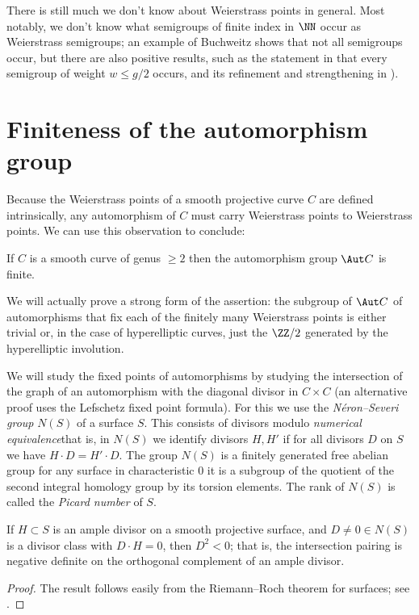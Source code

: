 There is still much we don't know about Weierstrass points in
general. Most notably, we don't know what semigroups of finite index in
$\NN$ occur as Weierstrass semigroups; an example of Buchweitz shows
%
that not all semigroups occur, but there are also positive results,
such as the statement in
\cite{EHWeierstrass}
that every semigroup of weight $w \leq g/2$
%
occurs, and its refinement and strengthening in \cite{MR3892968}).


\section{Finiteness of the automorphism group}\label{finiteness section}

Because the Weierstrass points of a smooth projective curve $C$ are
%
defined intrinsically, any automorphism of $C$ must carry Weierstrass
points to Weierstrass points. We can use this observation to
conclude:

\begin{theorem}\label{finite autos}
If $C$ is a smooth curve of genus $\geq 2$ then the automorphism group
$\Aut C$ is finite.
\end{theorem}

We will actually prove a strong form of the assertion: the subgroup of
$\Aut C$ of automorphisms that fix each  of the finitely many Weierstrass
points is either
 trivial or, in the case of hyperelliptic curves, just the $\ZZ/2$
 generated by the hyperelliptic involution.

We will study the fixed points of automorphisms by studying the
intersection of the graph of
an automorphism with the diagonal divisor in $C\times C$ (an alternative
proof uses the Lefschetz fixed point formula). For this we use the
%
%
\emph{N\'eron--Severi group} $N(S)$ of a surface $S$. This consists of
divisors modulo \emph{numerical equivalence}\emdash that is, in $N(S)$ we
%
identify divisors $H, H'$ if for all divisors $D$ on $S$ we have $H\cdot
D = H'\cdot D$. The group
$N(S)$ is a  finitely generated free abelian group for any surface\emdash
in characteristic 0 it is a subgroup of the quotient of the second
integral homology group by its torsion elements. The rank of $N(S)$
is called the \emph{Picard number} of $S$.

\begin{theorem}\label{hodge index}
If $H\subset S$ is an ample divisor on a smooth projective surface,
%
and $D \neq 0 \in N(S)$ is a divisor class with $D\cdot H = 0$, then
$D^2<0$; that is, the intersection pairing is negative definite on the
orthogonal complement of an
ample divisor.
\end{theorem}
\begin{proof}
The result follows easily from the Riemann--Roch theorem for surfaces;
see \cite[Theorem V.1.9]{Hartshorne1977}.
\end{proof}

